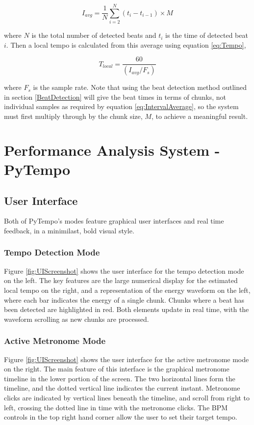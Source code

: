 \documentclass[hidelinks,12pt]{article}
\begin{document}
\begin{equation} \label{eq:IntervalAverage}
	I_{avg} = \frac{1}{N}\sum_{i=2}^{N}(t_i - t_{i-1}) \times M
\end{equation}

where $N$ is the total number of detected beats and $t_i$ is the time of detected beat $i$. Then a local tempo is calculated from this average using equation \ref{eq:Tempo},

\begin{equation} \label{eq:Tempo}
	T_{local} = \frac{60}{(I_{avg} / F_s)}
\end{equation}

where $F_s$ is the sample rate. Note that using the beat detection method outlined in section \ref{BeatDetection} will give the beat times in terms of chunks, not individual samples as required by equation \ref{eq:IntervalAverage}, so the system must first multiply through by the chunk size, $M$, to achieve a meaningful result.

\section{Performance Analysis System - PyTempo} \label{PyTempo}
\subsection{User Interface}
Both of PyTempo's modes feature graphical user interfaces and real time feedback, in a minimilast, bold visual style.

\subsubsection{Tempo Detection Mode}
Figure \ref{fig:UIScreenshot} shows the user interface for the tempo detection mode on the left. The key features are the large numerical display for the estimated local tempo on the right, and a representation of the energy waveform on the left, where each bar indicates the energy of a single chunk. Chunks where a beat has been detected are highlighted in red. Both elements update in real time, with the waveform scrolling as new chunks are processed.

\subsubsection{Active Metronome Mode}
Figure \ref{fig:UIScreenshot} shows the user interface for the active metronome mode on the right. The main feature of this interface is the graphical metronome timeline in the lower portion of the screen. The two horizontal lines form the timeline, and the dotted vertical line indicates the current instant. Metronome clicks are indicated by vertical lines beneath the timeline, and scroll from right to left, crossing the dotted line in time with the metronome clicks. The BPM controls in the top right hand corner allow the user to set their target tempo.
\end{document}
